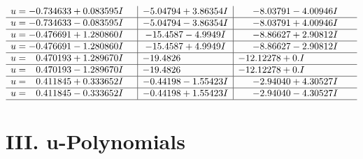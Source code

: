 \documentclass[1p]{elsarticle_modified}
\theoremstyle{definition}
\begin{document}
$$\begin{array}{c|c|c}
\begin{aligned}
u &= -0.734633 + 0.083595 I\end{aligned}
 & -5.04794 + 3.86354 I & -8.03791 - 4.00946 I \\ \hline\begin{aligned}
u &= -0.734633 - 0.083595 I\end{aligned}
 & -5.04794 - 3.86354 I & -8.03791 + 4.00946 I \\ \hline\begin{aligned}
u &= -0.476691 + 1.280860 I\end{aligned}
 & -15.4587 - 4.9949 I & -8.86627 + 2.90812 I \\ \hline\begin{aligned}
u &= -0.476691 - 1.280860 I\end{aligned}
 & -15.4587 + 4.9949 I & -8.86627 - 2.90812 I \\ \hline\begin{aligned}
u &= \phantom{-}0.470193 + 1.289670 I\end{aligned}
 & -19.4826\phantom{ +0.000000I} & -12.12278 + 0. I\phantom{ +0.000000I} \\ \hline\begin{aligned}
u &= \phantom{-}0.470193 - 1.289670 I\end{aligned}
 & -19.4826\phantom{ +0.000000I} & -12.12278 + 0. I\phantom{ +0.000000I} \\ \hline\begin{aligned}
u &= \phantom{-}0.411845 + 0.333652 I\end{aligned}
 & -0.44198 - 1.55423 I & -2.94040 + 4.30527 I \\ \hline\begin{aligned}
u &= \phantom{-}0.411845 - 0.333652 I\end{aligned}
 & -0.44198 + 1.55423 I & -2.94040 - 4.30527 I\\
 \hline 
 \end{array}$$\newpage
\newpage\renewcommand{\arraystretch}{1}
\centering \section*{ III. u-Polynomials}
\end{document}
